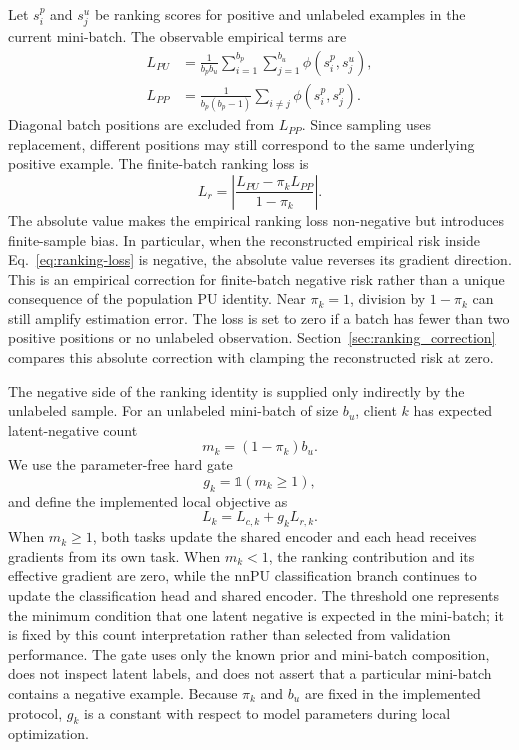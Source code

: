\documentclass[lettersize,journal]{IEEEtran}
\begin{document}
Let $s_i^p$ and $s_j^u$ be ranking scores for positive and unlabeled examples in the current mini-batch. The observable empirical terms are
\begin{align}
L_{PU}&=\frac{1}{b_pb_u}\sum_{i=1}^{b_p}\sum_{j=1}^{b_u}
\phi(s_i^p,s_j^u),
\label{eq:pu-ranking-risk}\\
L_{PP}&=\frac{1}{b_p(b_p-1)}\sum_{i\ne j}\phi(s_i^p,s_j^p).
\label{eq:pp-ranking-risk}
\end{align}
Diagonal batch positions are excluded from $L_{PP}$. Since sampling uses replacement, different positions may still correspond to the same underlying positive example. The finite-batch ranking loss is
\begin{equation}
L_r=\left|\frac{L_{PU}-\pi_kL_{PP}}{1-\pi_k}\right|.
\label{eq:ranking-loss}
\end{equation}
The absolute value makes the empirical ranking loss non-negative but introduces finite-sample bias. In particular, when the reconstructed empirical risk inside Eq.~\eqref{eq:ranking-loss} is negative, the absolute value reverses its gradient direction. This is an empirical correction for finite-batch negative risk rather than a unique consequence of the population PU identity. Near $\pi_k=1$, division by $1-\pi_k$ can still amplify estimation error. The loss is set to zero if a batch has fewer than two positive positions or no unlabeled observation. Section~\ref{sec:ranking_correction} compares this absolute correction with clamping the reconstructed risk at zero.

The negative side of the ranking identity is supplied only indirectly by the unlabeled sample. For an unlabeled mini-batch of size $b_u$, client $k$ has expected latent-negative count
\begin{equation}
m_k=(1-\pi_k)b_u.
\label{eq:expected-negatives}
\end{equation}
We use the parameter-free hard gate
\begin{equation}
g_k=\mathbb{1}(m_k\geq1),
\label{eq:ranking-gate}
\end{equation}
and define the implemented local objective as
\begin{equation}
L_k=L_{c,k}+g_kL_{r,k}.
\label{eq:joint-loss}
\end{equation}
When $m_k\geq1$, both tasks update the shared encoder and each head receives gradients from its own task. When $m_k<1$, the ranking contribution and its effective gradient are zero, while the nnPU classification branch continues to update the classification head and shared encoder. The threshold one represents the minimum condition that one latent negative is expected in the mini-batch; it is fixed by this count interpretation rather than selected from validation performance. The gate uses only the known prior and mini-batch composition, does not inspect latent labels, and does not assert that a particular mini-batch contains a negative example. Because $\pi_k$ and $b_u$ are fixed in the implemented protocol, $g_k$ is a constant with respect to model parameters during local optimization.
\end{document}
